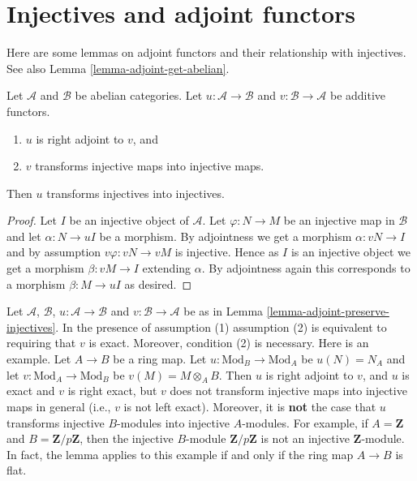 \section{Injectives and adjoint functors}
\label{section-adjoint}

\noindent
Here are some lemmas on adjoint functors and their relationship with
injectives. See also Lemma \ref{lemma-adjoint-get-abelian}.

\begin{lemma}
\label{lemma-adjoint-preserve-injectives}
Let $\mathcal{A}$ and $\mathcal{B}$ be abelian categories.
Let $u : \mathcal{A} \to \mathcal{B}$ and
$v : \mathcal{B} \to \mathcal{A}$ be additive functors.
\begin{enumerate}
\item $u$ is right adjoint to $v$, and
\item $v$ transforms injective maps into injective maps.
\end{enumerate}
Then $u$ transforms injectives into injectives.
\end{lemma}

\begin{proof}
Let $I$ be an injective object of $\mathcal{A}$.
Let $\varphi : N \to M$ be an injective map in $\mathcal{B}$ and let
$\alpha : N \to uI$ be a morphism.
By adjointness we get a morphism $\alpha : vN \to I$ and
by assumption $v\varphi : vN \to vM$ is injective.
Hence as $I$ is an injective object we get a morphism
$\beta : vM \to I$ extending $\alpha$. By adjointness
again this corresponds to a morphism $\beta : M \to uI$ as
desired.
\end{proof}

\begin{remark}
\label{remark-need-left-exactness}
Let $\mathcal{A}$, $\mathcal{B}$, $u : \mathcal{A} \to \mathcal{B}$ and
$v : \mathcal{B} \to \mathcal{A}$ be as in
Lemma \ref{lemma-adjoint-preserve-injectives}.
In the presence of assumption (1) assumption (2) is equivalent to requiring
that $v$ is exact. Moreover, condition (2) is necessary. Here is an example.
Let $A \to B$ be a ring map.
Let $u : \text{Mod}_B \to \text{Mod}_A$ be $u(N) = N_A$
and let $v : \text{Mod}_A \to \text{Mod}_B$ be
$v(M) = M \otimes_A B$. Then $u$ is right adjoint to $v$, and $u$ is
exact and $v$ is right exact, but $v$ does not transform injective maps into
injective maps in general (i.e., $v$ is not left exact).
Moreover, it is {\bf not} the case that $u$ transforms injective
$B$-modules into injective $A$-modules. For example, if
$A = \mathbf{Z}$ and $B = \mathbf{Z}/p\mathbf{Z}$, then
the injective $B$-module $\mathbf{Z}/p\mathbf{Z}$ is not
an injective $\mathbf{Z}$-module. In fact, the lemma applies to this
example if and only if the ring map $A \to B$ is flat.
\end{remark}

